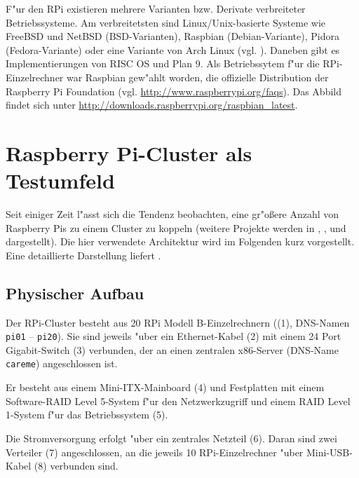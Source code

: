 F"ur den RPi existieren mehrere Varianten bzw. Derivate verbreiteter Betriebssysteme. Am verbreitetsten sind Linux/Unix-basierte Systeme wie FreeBSD und NetBSD (BSD-Varianten), Raspbian (Debian-Variante), Pidora (Fedora-Variante) oder eine Variante von Arch Linux (vgl. \cite{pow12}). Daneben gibt es Implementierungen von RISC OS und Plan 9. Als Betriebssytem f"ur die RPi-Einzelrechner war Raspbian gew"ahlt worden, die offizielle Distribution der Raspberry Pi Foundation (vgl. \url{http://www.raspberrypi.org/faqs}). Das Abbild findet sich unter \url{http://downloads.raspberrypi.org/raspbian_latest}. 

\section{Raspberry Pi-Cluster als Testumfeld}\label{Bramble-Spezi}

Seit einiger Zeit l"asst sich die Tendenz beobachten, eine gr"o\ss ere Anzahl von Raspberry Pis zu einem Cluster zu koppeln (weitere Projekte werden in \cite{cox13}, \cite{kie01}, \cite{bal12} und \cite{ou13} dargestellt). Die hier verwendete Architektur wird im Folgenden kurz vorgestellt. Eine detaillierte Darstellung liefert \cite{kli13}. 

\subsection{Physischer Aufbau}\label{Bramble-Hardware}

Der RPi-Cluster besteht aus 20 RPi Modell B-Einzelrechnern ((1), DNS-Namen \texttt{pi01} -- \texttt{pi20}). Sie sind jeweils "uber ein Ethernet-Kabel (2) mit einem 24 Port Gigabit-Switch (3) verbunden, der an einen zentralen x86-Server (DNS-Name \texttt{careme}) angeschlossen ist. 

Er besteht aus einem Mini-ITX-Mainboard (4) und %
Festplatten mit einem Software-RAID Level 5-System f"ur den Netzwerkzugriff und einem RAID Level 1-System f"ur das Betriebssystem (5).  

Die Stromversorgung erfolgt "uber ein zentrales Netzteil (6). Daran sind zwei Verteiler (7) angeschlossen, an die jeweils 10 RPi-Einzelrechner "uber Mini-USB-Kabel (8) verbunden sind. 

